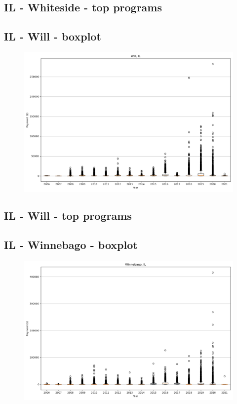 \subsection*{IL - Whiteside - top programs}

\newpage
\subsection*{IL - Will - boxplot}
\begin{figure}[h]
\centering
\includegraphics[width=7in]{../output/boxplots/counties/Will-IL_boxplot.png}
\end{figure}


\subsection*{IL - Will - top programs}

\newpage
\subsection*{IL - Winnebago - boxplot}
\begin{figure}[h]
\centering
\includegraphics[width=7in]{../output/boxplots/counties/Winnebago-IL_boxplot.png}
\end{figure}


